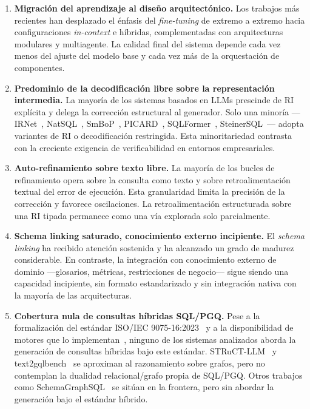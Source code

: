 \begin{enumerate}
    \item \textbf{Migración del aprendizaje al diseño arquitectónico.}
    Los trabajos más recientes han desplazado el énfasis del
    \emph{fine-tuning} de extremo a extremo hacia configuraciones
    \emph{in-context} e híbridas, complementadas con arquitecturas
    modulares y multiagente. La calidad final del sistema depende cada
    vez menos del ajuste del modelo base y cada vez más de la
    orquestación de componentes.

    \item \textbf{Predominio de la decodificación libre sobre la
    representación intermedia.} La mayoría de los sistemas basados en
    \acp{LLM} prescinde de RI explícita y delega la corrección
    estructural al generador. Solo una minoría
    ---IRNet~\cite{IRNet}, NatSQL~\cite{gan2021natsql},
    SmBoP~\cite{SmBoP2021}, PICARD~\cite{PICARD2022},
    SQLFormer~\cite{SQLFormer2023}, SteinerSQL~\cite{SteinerSQL2025}---
    adopta variantes de RI o decodificación restringida. Esta
    minoritariedad contrasta con la creciente exigencia de
    verificabilidad en entornos empresariales.

    \item \textbf{Auto-refinamiento sobre texto libre.} La mayoría de
    los bucles de refinamiento opera sobre la consulta como texto y
    sobre retroalimentación textual del error de ejecución. Esta
    granularidad limita la precisión de la corrección y favorece
    oscilaciones. La retroalimentación estructurada sobre una RI
    tipada permanece como una vía explorada solo parcialmente.

    \item \textbf{Schema linking saturado, conocimiento externo
    incipiente.} El \emph{schema linking} ha recibido atención
    sostenida y ha alcanzado un grado de madurez considerable. En
    contraste, la integración con conocimiento externo de dominio
    ---glosarios, métricas, restricciones de negocio--- sigue siendo
    una capacidad incipiente, sin formato estandarizado y sin
    integración nativa con la mayoría de las arquitecturas.

    \item \textbf{Cobertura nula de consultas híbridas
    \ac{SQL}/\ac{PGQ}.} Pese a la formalización del estándar
    ISO/IEC 9075-16:2023~\cite{ISO9075_16_2023} y a la disponibilidad
    de motores que lo implementan~\cite{DuckPGQ}, ninguno de los
    sistemas analizados aborda la generación de consultas híbridas
    bajo este estándar. STRuCT-LLM~\cite{STRuCT-LLM2025} y
    text2gqlbench~\cite{text2gqlbench} se aproximan al razonamiento
    sobre grafos, pero no contemplan la dualidad relacional/grafo
    propia de \ac{SQL}/\ac{PGQ}. Otros trabajos como
    SchemaGraphSQL~\cite{SchemaGraphSQL} se sitúan en la frontera, pero
    sin abordar la generación bajo el estándar híbrido.
\end{enumerate}

